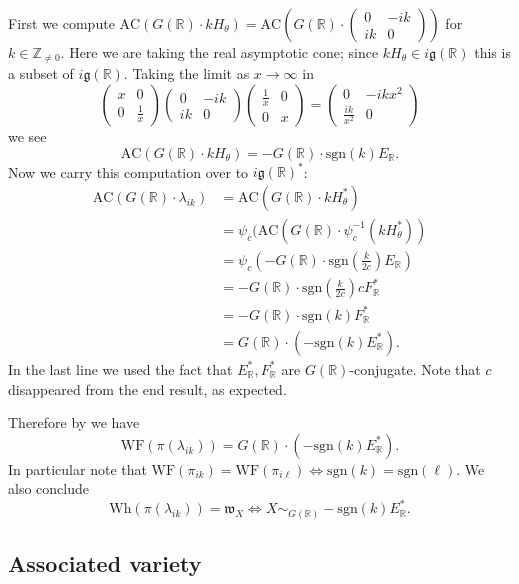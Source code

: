 \documentclass[10pt,leqno]{article}
\numberwithin{equation}{section}
\newcommand{\sgn}{\mathrm{sgn}}
\newcommand{\R}{\mathbb R}
\newcommand{\Z}{\mathbb Z}
\newcommand{\g}{\mathfrak g}
\newcommand\inv{^{-1}}
\newcommand{\w}{\mathfrak w}
\newcommand{\Wh}{\mathrm{Wh}}
\newcommand{\WF}{\mathrm{WF}}
\newcommand{\AC}{\mathrm{AC}}
\begin{document}
First we compute $\AC(G(\R)\cdot kH_\theta)=\AC(G(\R)\cdot\begin{pmatrix}0&-ik\\ik&0
\end{pmatrix})$ for $k\in \Z_{\ne 0}$.
Here we are taking the real asymptotic cone; since $kH_\theta\in i\g(\R)$ this is a subset of $i\g(\R)$. 
Taking the limit as $x\rightarrow \infty$ in 
$$
\begin{pmatrix}
x&0\\0&\frac 1x
\end{pmatrix}
\begin{pmatrix}0&-ik\\ik&0
\end{pmatrix}\begin{pmatrix}
\frac 1x&0\\0&x
\end{pmatrix}=
\begin{pmatrix}0&-ikx^2\\\frac{ik}{x^2}&0
\end{pmatrix}
$$
we see
$$
\AC(G(\R)\cdot kH_\theta)=-G(\R)\cdot\sgn(k)E_\R.
$$
Now we carry this computation over to $i\g(\R)^*$:
$$
\begin{aligned}
\AC(G(\R)\cdot\lambda_{ik})&=\AC(G(\R)\cdot kH_\theta^*)\\
&=\psi_c(\AC(G(\R)\cdot \psi_c\inv(kH_\theta^*))\\
&=\psi_c(-G(\R)\cdot\sgn(\frac k{2c})E_\R)\\
&=-G(\R)\cdot\sgn(\frac k{2c})cF_\R^*\\
&=-G(\R)\cdot\sgn(k)F_\R^*\\
&=G(\R)\cdot(-\sgn(k)E_\R^*).
\end{aligned}
$$
In the last line we used the fact that $E_\R^*,F_\R^*$ are $G(\R)$-conjugate.
Note that $c$ disappeared from the end result, as expected.

Therefore by 
\cite{HarrisHeOlafsson} we have
\begin{equation}
\label{e:WF}
\WF(\pi(\lambda_{ik}))=G(\R)\cdot (-\sgn(k)E_\R^*).
\end{equation}
In particular note that $\WF(\pi_{ik})=\WF(\pi_{i\ell})\Leftrightarrow \sgn(k)=\sgn(\ell)$.
We also conclude
$$
\Wh(\pi(\lambda_{ik}))=\w_X\Leftrightarrow X\sim_{G(\R)} -\sgn(k)E_\R^*.
$$

\subsection{Associated variety}
\end{document}

